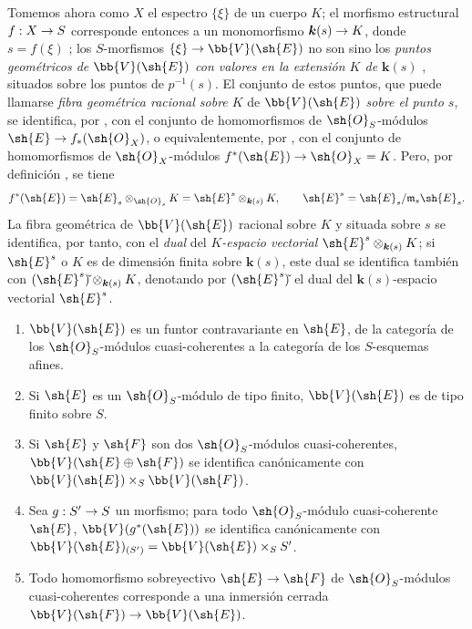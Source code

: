 \documentclass[oneside,10pt]{amsart}
\makeatletter
\newcommand{\ega@arrow}[2]{\mathchoice{#1}{#2}{#2}{#2}}
\renewcommand{\to}{\ega@arrow{\longrightarrow}{\rightarrow}}
\let\EGAOriginalLabel\label
\renewcommand{\label}[1]{\phantomsection\EGAOriginalLabel{#1}}
\makeatother
\begin{document}
\begin{env}[1.7.10]
\label{II.1.7.10}
Tomemos ahora como $X$ el espectro $\{\xi\}$ de un cuerpo $K$; el morfismo estructural $f:X\to S$ corresponde entonces a un monomorfismo $\boldsymbol{k}(s)\to K$, donde $s=f(\xi)$ ; los $S$-morfismos $\{\xi\}\to\bb{V}(\sh{E})$ no son sino los \emph{puntos geométricos de $\bb{V}(\sh{E})$ con valores en la extensión $K$ de $\boldsymbol{k}(s)$} , situados sobre los puntos de $p^{-1}(s)$.
El conjunto de estos puntos, que puede llamarse \emph{fibra geométrica racional sobre $K$} de $\bb{V}(\sh{E})$ \emph{sobre el punto $s$}, se identifica, por , con el conjunto de homomorfismos de $\sh{O}_S$-módulos $\sh{E}\to f_*(\sh{O}_X)$, o equivalentemente, por , con el conjunto de homomorfismos de $\sh{O}_X$-módulos $f^*(\sh{E})\to\sh{O}_X=K$.
Pero, por definición , se tiene
\[
  f^*(\sh{E})=\sh{E}_s\otimes_{\sh{O}_s}K
  =\sh{E}^s\otimes_{\boldsymbol{k}(s)}K,
  \qquad
  \sh{E}^s=\sh{E}_s/\mathfrak{m}_s\sh{E}_s.
\]
La fibra geométrica de $\bb{V}(\sh{E})$ racional sobre $K$ y situada sobre $s$ se identifica, por tanto, con el \emph{dual} del \emph{$K$-espacio vectorial $\sh{E}^s\otimes_{\boldsymbol{k}(s)}K$}; si $\sh{E}^s$ o $K$ es de dimensión finita sobre $\boldsymbol{k}(s)$, este dual se identifica también con $(\sh{E}^s)\check{}\otimes_{\boldsymbol{k}(s)}K$, denotando por $(\sh{E}^s)\check{}$ el dual del $\boldsymbol{k}(s)$-espacio vectorial $\sh{E}^s$.
\end{env}

\begin{proposition}[1.7.11]
\label{II.1.7.11}
\medskip\noindent
\begin{enumerate}
  \item[{\rm(i)}] $\bb{V}(\sh{E})$ es un funtor contravariante en $\sh{E}$, de la categoría de los $\sh{O}_S$-módulos cuasi-coherentes a la categoría de los $S$-esquemas afines.
  \item[{\rm(ii)}] Si $\sh{E}$ es un $\sh{O}_S$-módulo de tipo finito, $\bb{V}(\sh{E})$ es de tipo finito sobre $S$.
  \item[{\rm(iii)}] Si $\sh{E}$ y $\sh{F}$ son dos $\sh{O}_S$-módulos cuasi-coherentes, $\bb{V}(\sh{E}\oplus\sh{F})$ se identifica canónicamente con $\bb{V}(\sh{E})\times_S\bb{V}(\sh{F})$.
  \item[{\rm(iv)}] Sea $g:S'\to S$ un morfismo; para todo $\sh{O}_S$-módulo cuasi-coherente $\sh{E}$, $\bb{V}(g^*(\sh{E}))$ se identifica canónicamente con $\bb{V}(\sh{E})_{(S')}=\bb{V}(\sh{E})\times_S S'$.
  \item[{\rm(v)}] Todo homomorfismo sobreyectivo $\sh{E}\to\sh{F}$ de $\sh{O}_S$-módulos cuasi-coherentes corresponde a una inmersión cerrada $\bb{V}(\sh{F})\to\bb{V}(\sh{E})$.
\end{enumerate}
\end{proposition}
\end{document}
